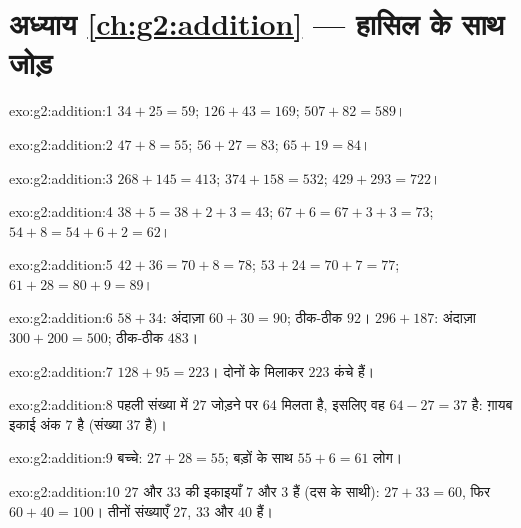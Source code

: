 \section*{अध्याय \ref{ch:g2:addition} --- हासिल के साथ जोड़}

\begin{solution}{exo:g2:addition:1}
$34 + 25 = 59$; \quad $126 + 43 = 169$; \quad $507 + 82 = 589$।
\end{solution}

\begin{solution}{exo:g2:addition:2}
$47 + 8 = 55$; \quad $56 + 27 = 83$; \quad $65 + 19 = 84$।
\end{solution}

\begin{solution}{exo:g2:addition:3}
$268 + 145 = 413$; \quad $374 + 158 = 532$; \quad
$429 + 293 = 722$।
\end{solution}

\begin{solution}{exo:g2:addition:4}
$38 + 5 = 38 + 2 + 3 = 43$; \quad $67 + 6 = 67 + 3 + 3 = 73$; \quad
$54 + 8 = 54 + 6 + 2 = 62$।
\end{solution}

\begin{solution}{exo:g2:addition:5}
$42 + 36 = 70 + 8 = 78$; \quad $53 + 24 = 70 + 7 = 77$; \quad
$61 + 28 = 80 + 9 = 89$।
\end{solution}

\begin{solution}{exo:g2:addition:6}
$58 + 34$: अंदाज़ा $60 + 30 = 90$; ठीक-ठीक $92$।
$296 + 187$: अंदाज़ा $300 + 200 = 500$; ठीक-ठीक $483$।
\end{solution}

\begin{solution}{exo:g2:addition:7}
$128 + 95 = 223$। दोनों के मिलाकर $223$ कंचे हैं।
\end{solution}

\begin{solution}{exo:g2:addition:8}
पहली संख्या में $27$ जोड़ने पर $64$ मिलता है, इसलिए वह
$64 - 27 = 37$ है: ग़ायब इकाई अंक $7$ है (संख्या $37$ है)।
\end{solution}

\begin{solution}{exo:g2:addition:9}
बच्चे: $27 + 28 = 55$; बड़ों के साथ $55 + 6 = 61$
लोग।
\end{solution}

\begin{solution}{exo:g2:addition:10}
$27$ और $33$ की इकाइयाँ $7$ और $3$ हैं (दस के साथी):
$27 + 33 = 60$, फिर $60 + 40 = 100$। तीनों संख्याएँ
$27$, $33$ और $40$ हैं।
\end{solution}
